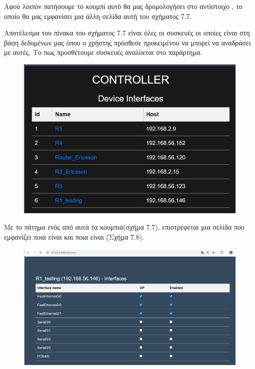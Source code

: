 \FloatBarrier

Αφού λοιπόν πατήσουμε το κουμπί  αυτό θα μας δρομολογήσει στο αντίστοιχο ,
το οποίο θα μας εμφανίσει μια άλλη σελίδα αυτή του σχήματος 7.7. 

Αποτέλεσμα του πίνακα του σχήματος 7.7 είναι όλες οι συσκευές οι οποίες
είναι στη βάση δεδομένων μας όπου ο χρήστης πρόσθεσε προκειμένου
να μπορεί να αναδράσει με αυτές. Το πως προσθέτουμε συσκευές αναλύεται στο παράρτημα.

\FloatBarrier
\begin{figure}[htb]
	\centering
	\includegraphics[width=1.2\textwidth]{graphics/device_interfaces.png}
	\caption{}
\end{figure}

\FloatBarrier

Με το πάτημα ενός από αυτά τα κουμπιά(σχήμα 7.7), επιστρέφεται μια σελίδα  που εμφανίζει ποια  είναι  και ποια είναι  (Σχήμα 7.8).

\FloatBarrier
\begin{figure}[htb]
	\centering
	\includegraphics[width=1.2\textwidth]{graphics/interfaces.png}
	\caption{}
\end{figure}
\FloatBarrier



